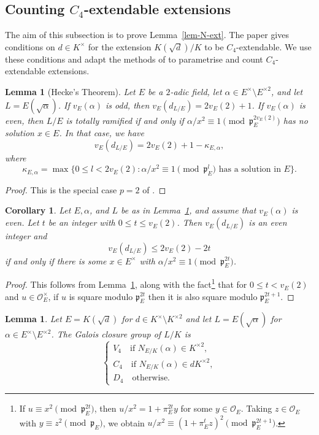 \documentclass[11pt]{amsart}
\theoremstyle{theorem}
\newtheorem{lemma}[theorem]{Lemma}
\newtheorem{corollary}[theorem]{Corollary}
\theoremstyle{example}
\theoremstyle{definition}
\numberwithin{theorem}{section}
\numberwithin{theorem}{section}
\newcommand{\co}{\mathcal{O}}
\newcommand{\p}{\mathfrak{p}}
\begin{document}
\subsection{Counting $C_4$-extendable extensions}
The aim of this subsection is to prove Lemma~\ref{lem-N-ext}. The paper \cite{cohen-et-al} gives conditions on $d \in K^\times$ for the extension $K(\sqrt{d})/K$ to be $C_4$-extendable. We use these conditions and adapt the methods of \cite{cohen-et-al} to parametrise and count $C_4$-extendable extensions. 
\begin{lemma}[Hecke's Theorem]
    \label{lem-hecke}
    Let $E$ be a $2$-adic field, let $\alpha \in E^\times \setminus E^{\times 2}$, and let $L = E(\sqrt{\alpha})$. If $v_E(\alpha)$ is odd, then $v_E(d_{L/E}) = 2v_E(2) + 1$. If $v_E(\alpha)$ is even, then $L/E$ is totally ramified if and only if $\alpha / x^2\equiv 1 \pmod{\p_E^{2v_E(2)}}$ has no solution $x \in E$. In that case, we have
    $$
    v_E(d_{L/E}) = 2v_E(2) + 1 - \kappa_{E,\alpha},
    $$
    where 
    $$
    \kappa_{E,\alpha} = \max\{0 \leq l < 2v_E(2) : \alpha / x^2\equiv 1 \pmod{\p_E^l} \text{ has a solution in $E$}\}.
    $$
\end{lemma}
\begin{proof}
    This is the special case $p=2$ of \cite[Theorem~2.4]{hecke-theorem}.
\end{proof}

\begin{corollary}
    \label{cor-disc-square-mod-2t+1}
    Let $E, \alpha$, and $L$ be as in Lemma~\ref{lem-hecke}, and assume that $v_E(\alpha)$ is even. Let $t$ be an integer with $0 \leq t \leq v_E(2)$. Then $v_E(d_{L/E})$ is an even integer and 
    $$
    v_E(d_{L/E}) \leq 2v_E(2) - 2t
    $$ 
    if and only if there is some $x \in E^\times$ with $\alpha / x^2\equiv 1 \pmod{\p_E^{2t}}$. 
\end{corollary}
\begin{proof}
    This follows from Lemma~\ref{lem-hecke}, along with the fact\footnote{If $u \equiv x^2\pmod{\p_E^{2t}}$, then $u/x^2 = 1 + \pi_E^{2t}y$ for some $y \in \co_E$. Taking $z \in \co_E$ with $y \equiv z^2\pmod{\p_E}$, we obtain $u/x^2 \equiv  (1 + \pi_E^tz)^2\pmod{\p_E^{2t+1}}$.} that for $0 \leq t < v_E(2)$ and $u \in \co_E^\times$, if $u$ is square modulo $\p_E^{2t}$ then it is also square modulo $\p_E^{2t+1}$.
\end{proof}
\begin{lemma}
    \label{lem-GG-norm-conditions}
    Let $E = K(\sqrt{d})$ for $d \in K^{\times}\setminus K^{\times 2}$ and let $L = E(\sqrt{\alpha})$ for $\alpha \in E^\times\setminus E^{\times 2}$. The Galois closure group of $L/K$ is 
    $$
    \begin{cases}
        V_4\quad\text{if $N_{E/K}(\alpha)\in K^{\times 2}$},
        \\
        C_4 \quad\text{if $N_{E/K}(\alpha) \in dK^{\times 2}$},
        \\
        D_4\quad\text{otherwise.}
    \end{cases}
    $$
\end{lemma}
\end{document}
